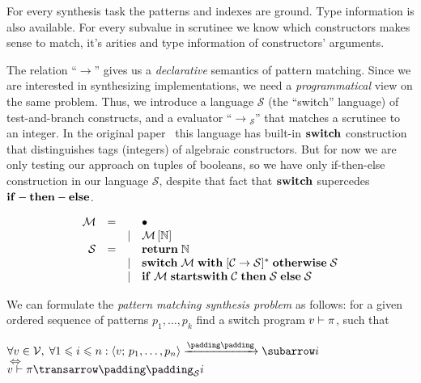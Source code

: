 For every synthesis task the patterns and indexes are ground. Type information is also available. For every subvalue in scrutinee we know which constructors makes sense to match, it's arities and type information of constructors' arguments.

The relation ``$\xrightarrow{}{}\!\!$'' gives us a \emph{declarative} semantics of pattern matching. Since we are interested in
synthesizing implementations, we need a \emph{programmatical} view on the same problem. Thus, we introduce a language $\mathcal S$
(the ``switch'' language) of test-and-branch constructs, and a evaluator ``$\xrightarrow{}{}_{\!\!\mathcal S}$'' that matches a scrutinee to an integer.
In the original paper~\cite{Kosarev2020} this language has built-in $\mathbf{switch}$ construction that distinguishes tags (integers) of algebraic constructors. But for now we are only testing our approach on tuples of booleans, so we have only if-then-else construction in our language $\mathcal{S}$, despite that fact that $\mathbf{switch}$ supercedes $\mathbf{if-then-else}$.

\[
\begin{array}{rccl}
  \mathcal M & = &       & \bullet \\
             &   & \mid  & \mathcal M\,[\mathbb{N}] \\
  \mathcal{S}        & = &       & \mathbf{return}\;\mathbb{N} \\
             &   & \mid  & \mathbf{switch}\;\mathcal{M}\;\mathbf{with}\; [\mathcal{C}\; \mathbf{\rightarrow}\; \mathcal{S}]^*\;\mathbf{otherwise}\;\mathcal{S}\\
             &   & \mid  & \mathbf{if}\;\mathcal{M}\;\mathbf{starts with}\;\mathcal{C}\;\mathbf{then}\; \mathcal{S}\;\mathbf{else}\;\mathcal{S}
\end{array}
\]

We can formulate the \emph{pattern matching synthesis problem} as follows: for a given ordered sequence of patterns $p_1,\dots,p_k$ find
a switch program ${v}\vdash{\pi}$, such that

\begin{center}
$\setarrow{\xrightarrow}
\forall v\in \mathcal V,\; \forall 1\leqslant i\leqslant n: \trans{\inbr{v;\,p_1,\dots,p_n}}{}{i}$\\
$\Longleftrightarrow$ \\
$\setsubarrow{_{\mathcal S}}\withenv{v}{\trans{\pi}{}{i}}$ \\
\end{center}

